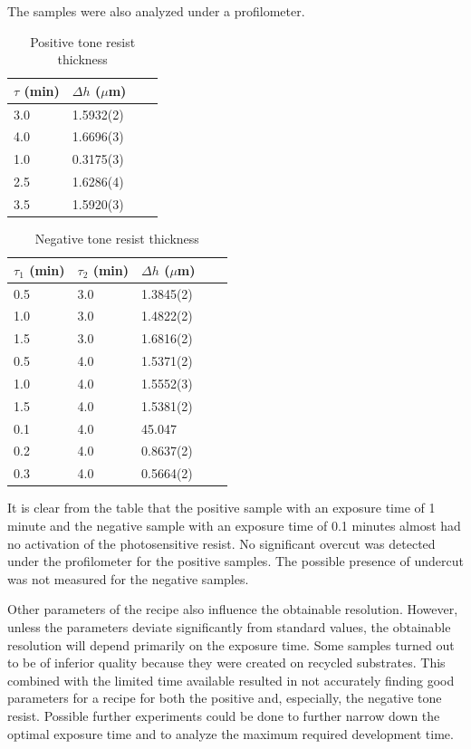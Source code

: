 The samples were also analyzed under a profilometer.

\begin{table}[H]
    \centering
    \caption{Positive tone resist thickness}
    \begin{tabular}{X l l l}
        $\tau$ (min)& $\Delta h$ ($\mu$m) \\ 
        \hline\hline
        3.0 & 1.5932(2) \\
        4.0 & 1.6696(3) \\
        1.0 & 0.3175(3) \\
        2.5 & 1.6286(4) \\
        3.5 & 1.5920(3) \\
        \hline
    \end{tabular}
    \label{tab:pos_profile}
\end{table}

\begin{table}[H]
    \centering
    \caption{Negative tone resist thickness}
    \begin{tabular}{X l l l l}
	$\tau_1$ (min) & $\tau_2$ (min) & $\Delta h$ ($\mu$m) \\ 
        \hline\hline
        0.5 & 3.0 & 1.3845(2)  \\
        1.0 & 3.0 & 1.4822(2)  \\
        1.5 & 3.0 & 1.6816(2)  \\
        0.5 & 4.0 & 1.5371(2)  \\
        1.0 & 4.0 & 1.5552(3)  \\
        1.5 & 4.0 & 1.5381(2)  \\
        0.1 & 4.0 & 45.047     \\
        0.2 & 4.0 & 0.8637(2)  \\
        0.3 & 4.0 & 0.5664(2)  \\
        \hline
    \end{tabular}
    \label{tab:neg_profile}
\end{table}

It is clear from the table that the positive sample with an exposure time of  1 minute and the negative sample with an exposure time of 0.1 minutes almost had no activation of the photosensitive resist. No significant overcut was detected under the profilometer for the positive samples. The possible presence of undercut was not measured for the negative samples.


Other parameters of the recipe also influence the obtainable resolution. However, unless the parameters deviate significantly from standard values, the obtainable resolution will depend primarily on the exposure time. Some samples turned out to be of inferior quality because they were created on recycled substrates. This combined with the limited time available resulted in not accurately finding good parameters for a recipe for both the positive and, especially, the negative tone resist. Possible further experiments could be done to further narrow down the optimal exposure time and to analyze the maximum required development time.
